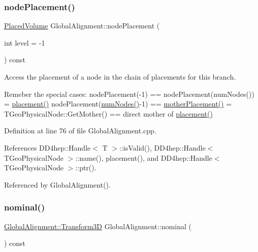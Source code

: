 \subsubsection{\texorpdfstring{node\+Placement()}{nodePlacement()}}
{\footnotesize\ttfamily \hyperlink{class_d_d4hep_1_1_geometry_1_1_placed_volume}{Placed\+Volume} Global\+Alignment\+::node\+Placement (\begin{DoxyParamCaption}\item[{int}]{level = {\ttfamily -\/1} }\end{DoxyParamCaption}) const}



Access the placement of a node in the chain of placements for this branch. 

Remeber the special cases\+: node\+Placement(-\/1) == node\+Placement(num\+Nodes()) = \hyperlink{class_d_d4hep_1_1_alignments_1_1_global_alignment_a86507e649b9f619db6731be3a3c482b5}{placement()} node\+Placement(\hyperlink{class_d_d4hep_1_1_alignments_1_1_global_alignment_af98ddcc7a707a635f9e7545faadf4fb5}{num\+Nodes()}-\/1) == \hyperlink{class_d_d4hep_1_1_alignments_1_1_global_alignment_a546653105428014c4917ca502dc63e4b}{mother\+Placement()} = T\+Geo\+Physical\+Node\+::\+Get\+Mother() == direct mother of \hyperlink{class_d_d4hep_1_1_alignments_1_1_global_alignment_a86507e649b9f619db6731be3a3c482b5}{placement()} 

Definition at line 76 of file Global\+Alignment.\+cpp.



References D\+D4hep\+::\+Handle$<$ T $>$\+::is\+Valid(), D\+D4hep\+::\+Handle$<$ T\+Geo\+Physical\+Node $>$\+::name(), placement(), and D\+D4hep\+::\+Handle$<$ T\+Geo\+Physical\+Node $>$\+::ptr().



Referenced by Global\+Alignment().

\hypertarget{class_d_d4hep_1_1_alignments_1_1_global_alignment_a85c1483a3003d77e1006b9c81ae0801d}{}\label{class_d_d4hep_1_1_alignments_1_1_global_alignment_a85c1483a3003d77e1006b9c81ae0801d} 
\subsubsection{\texorpdfstring{nominal()}{nominal()}}
{\footnotesize\ttfamily \hyperlink{class_d_d4hep_1_1_alignments_1_1_global_alignment_a328240cbc53ba92424336a5898ba49d3}{Global\+Alignment\+::\+Transform3D} Global\+Alignment\+::nominal (\begin{DoxyParamCaption}{ }\end{DoxyParamCaption}) const}




